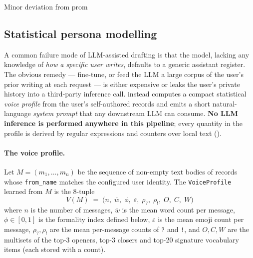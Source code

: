 Minor deviation from prom

\subsection{Statistical persona modelling}
\label{sec:persona}

A common failure mode of LLM-assisted drafting is that the model,
lacking any knowledge of \emph{how a specific user writes}, defaults to a
generic assistant register. The obvious remedy --- fine-tune, or feed the
LLM a large corpus of the user's prior writing at each request --- is
either expensive or leaks the user's private history into a third-party
inference call. \coviber{} instead computes a compact statistical
\emph{voice profile} from the user's self-authored records and emits a
short natural-language \emph{system prompt} that any downstream LLM can
consume. \textbf{No LLM inference is performed anywhere in this
pipeline}; every quantity in the profile is derived by regular
expressions and counters over local text ().

\paragraph{The voice profile.}
Let $M = (m_1, \ldots, m_n)$ be the sequence of non-empty text bodies of
records whose \texttt{from\_name} matches the configured user identity.
The \texttt{VoiceProfile} learned from $M$ is the 8-tuple
\begin{equation}
  V(M) \;=\;
  \bigl(
    n,\;
    \overline{w},\;
    \phi,\;
    \varepsilon,\;
    \rho_?,\;
    \rho_!,\;
    O,\;
    C,\;
    W
  \bigr)
  \label{eq:voice}
\end{equation}
where $n$ is the number of messages, $\overline{w}$ is the mean word
count per message, $\phi \in [0,1]$ is the formality index defined
below, $\varepsilon$ is the mean emoji count per message,
$\rho_?, \rho_!$ are the mean per-message counts of \texttt{?} and
\texttt{!}, and $O, C, W$ are the multisets of the top-3 openers, top-3
closers and top-20 signature vocabulary items (each stored with a count).

